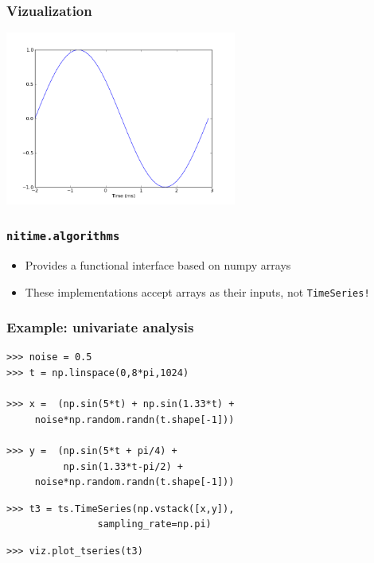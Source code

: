 \documentclass{beamer}
\begin{document}
\begin{frame}
\frametitle{Vizualization}
\includegraphics[height=5.7cm]{figures/simple_viz2}
\end{frame}


\begin{frame}
\frametitle{\tt{nitime.algorithms}}
\begin{itemize}
\pause
\item
Provides a functional interface based on numpy arrays
\pause
\item
These implementations accept arrays as their inputs, not \tt{TimeSeries}!
\end{itemize}
\end{frame}

\begin{frame}[fragile]
\frametitle{Example: univariate analysis}
\pause
\begin{lstlisting}
>>> noise = 0.5
>>> t = np.linspace(0,8*pi,1024) 

>>> x =  (np.sin(5*t) + np.sin(1.33*t) +  
     noise*np.random.randn(t.shape[-1]))

>>> y =  (np.sin(5*t + pi/4) + 
          np.sin(1.33*t-pi/2) +
     noise*np.random.randn(t.shape[-1]))
\end{lstlisting}

\pause
\begin{lstlisting}
>>> t3 = ts.TimeSeries(np.vstack([x,y]),
                sampling_rate=np.pi)
\end{lstlisting}

\pause
\begin{lstlisting}
>>> viz.plot_tseries(t3)
\end{lstlisting}
\end{frame}
\end{document}
